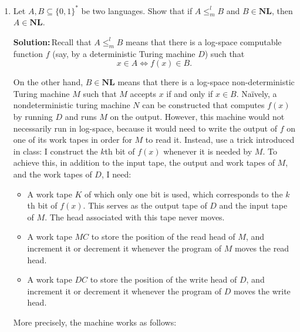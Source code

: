 \documentclass{amsart}
\theoremstyle{plain}
\theoremstyle{definition}
\newcommand{\nl}{\textbf{NL}}
\newcommand{\sol}{\textbf{Solution:\,}}
\begin{document}
\begin{enumerate}[label=\textbf{Exercise \arabic*:}, leftmargin=0cm, labelwidth=-0.2cm, align=left]
        \item
            Let $A, B \subseteq \{0, 1\}^*$ be two languages.
            Show that if $A \leq_m^l B$ and $B \in \nl$, then $A \in \nl$.

            \sol Recall that $A \leq_m^l B$ means that there is a log-space computable function $f$
            (say, by a deterministic Turing machine $D$) such that
            \begin{equation}
                x \in A \iff f(x) \in B.
                \label{eq:logspace}
            \end{equation}

            On the other hand, $B \in \nl$ means that there is a log-space non-deterministic Turing machine $M$
            such that $M$ accepts $x$ if and only if $x \in B$.
            Naïvely, a nondeterministic turing machine $N$ can be constructed that computes $f(x)$ by running $D$ and runs $M$ on the output.
            However, this machine would not necessarily run in log-space, because it would need to write the output of $f$ on one of its
            work tapes in order for $M$ to read it.
            Instead, use a trick introduced in class: I construct the $k$th bit of $f(x)$ whenever it is needed by $M$.
            To achieve this, in addition to the input tape, the output and work tapes of  $M$, and the work tapes of $D$, I need:
            \begin{itemize}
                \item A work tape $K$ of which only one bit is used, which corresponds to the $k$th bit of $f(x)$.
                This serves as the output tape of $D$ and the input tape of $M$.
                The head associated with this tape never moves.

                \item A work tape $MC$ to store the position of the read head of $M$, and increment it or decrement it
                whenever the program of $M$ moves the read head.

                \item A work tape $DC$ to store the position of the write head of $D$, and increment it or decrement it
                whenever the program of $D$ moves the write head.
            \end{itemize}

            More precisely, the machine works as follows:


\end{enumerate}
\end{document}
